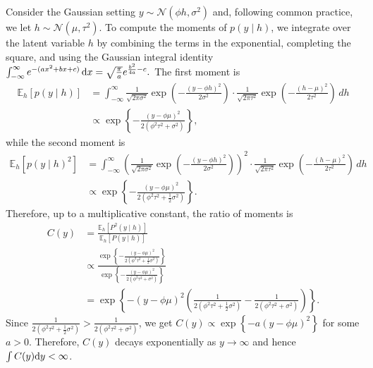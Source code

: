 Consider the Gaussian setting $y \sim \mathcal{N}(\phi h, \sigma^2)$
and, following common practice, we let $h \sim \mathcal{N}(\mu, \tau^2)$. 
To compute the moments of $p(y \mid h)$, we integrate over the latent variable $h$ by combining the terms in the exponential, completing the square, and using the Gaussian integral identity
$\int_{-\infty}^{\infty} e^{-(a x^2 + b x + c)} \, \mathrm{d} x = \sqrt{\frac{\pi}{a}} e^{\frac{b^2}{4a} - c}.$ 
The first moment is 
% 
\begin{align}
\mathbb{E}_h [p(y \mid h)] 
&= \int_{-\infty}^{\infty} \frac{1}{\sqrt{2\pi\sigma^2}} \exp\left(-\frac{(y - \phi h)^2}{2\sigma^2} \right)
\cdot \frac{1}{\sqrt{2\pi\tau^2}} \exp\left(-\frac{(h - \mu)^2}{2\tau^2} \right) \, dh \\
&\propto \exp\left\{ -\frac{(y - \phi \mu)^2}{2(\phi^2 \tau^2 + \sigma^2)} \right\},
\end{align}
while the second moment is 
\begin{align}
\mathbb{E}_h [p(y \mid h)^2] 
&= \int_{-\infty}^{\infty} \left( \frac{1}{\sqrt{2\pi\sigma^2}} \exp\left(-\frac{(y - \phi h)^2}{2\sigma^2} \right) \right)^2
\cdot \frac{1}{\sqrt{2\pi\tau^2}} \exp\left(-\frac{(h - \mu)^2}{2\tau^2} \right) \, dh \\
&\propto \exp\left\{ -\frac{(y - \phi \mu)^2}{2(\phi^2 \tau^2 + \frac{1}{2}\sigma^2)} \right\}.
\end{align}
Therefore, up to a multiplicative constant, the ratio of moments is 
\begin{align}
    C(y) 
    &= \frac{\mathbb{E}_{h}[P^{2}(y\mid h)]}{\mathbb{E}_{h}[P(y\mid h)]} \\
    &\propto \frac{ \exp\left\{ -\frac{(y - \phi \mu)^2}{2(\phi^2 \tau^2 + \frac{1}{2}\sigma^2)} \right\} }{ \exp\left\{ -\frac{(y - \phi \mu)^2}{2(\phi^2 \tau^2 + \sigma^2)} \right\} }\\
    &= \exp\left\{ -(y - \phi \mu)^2 \left( \frac{1}{2(\phi^2 \tau^2 + \frac{1}{2}\sigma^2)} - \frac{1}{2(\phi^2 \tau^2 + \sigma^2)} \right) \right\}.
\end{align}
Since $\frac{1}{2(\phi^2 \tau^2 + \frac{1}{2}\sigma^2)} > \frac{1}{2(\phi^2 \tau^2 + \sigma^2)}$, 
we get $C(y) \propto \exp\left\{ -a (y - \phi \mu)^2 \right\}$ for some $a > 0$. Therefore,
$C(y)$ decays exponentially as $y \to \infty$ and hence $\int C(y)\d y <\infty$.  



